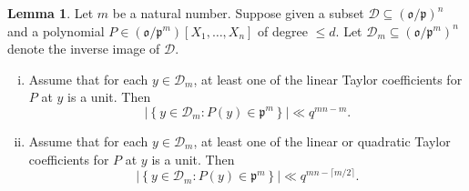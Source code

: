 \documentclass[reqno]{amsart}
\theoremstyle{plain} \newtheorem{theorem} {Theorem} \newtheorem{conjecture} {Conjecture} \newtheorem{corollary} [theorem] {Corollary} \newtheorem{proposition} [theorem] {Proposition} \newtheorem{fact} [theorem] {Fact}
\theoremstyle{definition} \newtheorem{definition} [theorem] {Definition}
\theoremstyle{itplain} %
\newtheorem{lemma}[theorem]{Lemma}
\begin{document}
\begin{lemma}\label{lemma:let-d-geq-0.-supp-given-subs-mathc-subs-mathfr-p}
  Let $m$ be a natural number.  Suppose given a subset $\mathcal{D} \subseteq {(\mathfrak{o}/\mathfrak{p})}^n$ and a polynomial $P \in (\mathfrak{o}/\mathfrak{p}^m)[X_1,\dotsc,X_n]$ of degree $\leq d$.  Let $\mathcal{D}_m \subseteq {(\mathfrak{o}/\mathfrak{p}^m)}^n$ denote the inverse image of $\mathcal{D}$.
  \begin{enumerate}[(i)]
  \item\label{enumerate:assume-that-each-y-in-mathc-one-line-tayl-coeff-p-} Assume that for each $y \in \mathcal{D}_m$, at least one of the linear Taylor coefficients for $P$ at $y$ is a unit.  Then
    \begin{equation*}
      \lvert \left\{ y \in \mathcal{D}_m : P(y) \in \mathfrak{p}^m \right\} \rvert \ll q^{m n - m}.
    \end{equation*}
  \item\label{enumerate:assume-that-each-y-in-mathc-one-line-or-quadr-tayl} Assume that for each $y \in \mathcal{D}_m$, at least one of the linear or quadratic Taylor coefficients for $P$ at $y$ is a unit.  Then
    \begin{equation*}
      \lvert \left\{ y \in \mathcal{D}_m : P(y) \in \mathfrak{p}^m \right\} \rvert \ll q^{m n - \lceil m/2 \rceil}.
    \end{equation*}
  \end{enumerate}
\end{lemma}
\end{document}
